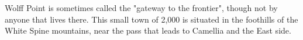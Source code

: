 Wolff Point is sometimes called the "gateway to the frontier", though not by anyone that lives there.
This small town of 2,000 is situated in the foothills of the White Spine mountains, near the pass that leads to Camellia and the East side.


